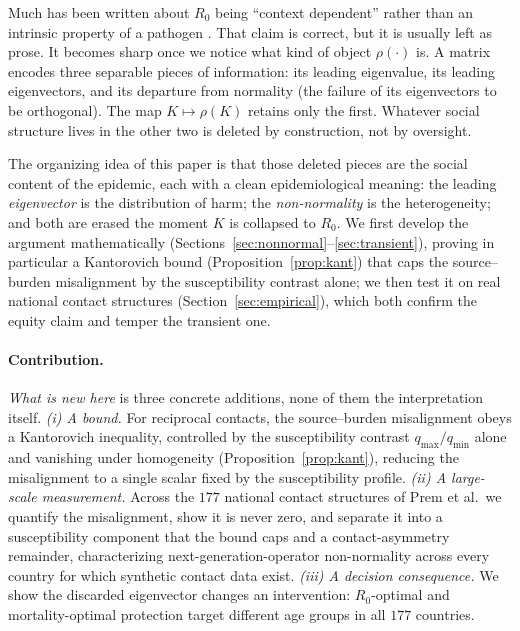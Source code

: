 \documentclass[12pt]{article}
\begin{document}
Much has been written about $R_0$ being ``context dependent'' rather than an intrinsic property of a pathogen \cite{delamater2019}. That claim is correct, but it is usually left as prose. It becomes sharp once we notice what kind of object $\rho(\cdot)$ is. A matrix encodes three separable pieces of information: its leading eigenvalue, its leading eigenvectors, and its departure from normality (the failure of its eigenvectors to be orthogonal). The map $K\mapsto\rho(K)$
retains only the first. Whatever social structure lives in the other two is deleted by construction, not by oversight.

The organizing idea of this paper is that those deleted pieces are the social content of the epidemic, each with a clean epidemiological meaning:
the leading \emph{eigenvector} is the distribution of harm; the \emph{non-normality} is the heterogeneity; and both are erased the moment $K$ is collapsed to $R_0$.
We first develop the argument mathematically (Sections~\ref{sec:nonnormal}--\ref{sec:transient}), proving in particular a Kantorovich bound (Proposition~\ref{prop:kant}) that caps the source--burden misalignment by the susceptibility contrast alone; we then test it on real national contact structures (Section~\ref{sec:empirical}), which both confirm the equity claim and temper the
transient one.


\paragraph{Contribution.}\emph{What is new here} is three concrete additions, none of them the interpretation itself. \emph{(i) A bound.} For reciprocal contacts, the source--burden misalignment obeys a Kantorovich inequality, controlled by the susceptibility contrast $q_{\max}/q_{\min}$ alone and vanishing under homogeneity (Proposition~\ref{prop:kant}), reducing the misalignment to a single scalar fixed by the susceptibility profile. \emph{(ii) A large-scale measurement.} Across the $177$ national contact structures of Prem et al.\ we quantify the misalignment, show it is never zero, and separate it into a susceptibility component that the bound caps and a contact-asymmetry remainder, characterizing next-generation-operator non-normality across every country for which synthetic contact data exist. \emph{(iii) A decision consequence.} We show the discarded eigenvector changes an intervention: $R_0$-optimal and mortality-optimal protection target different age groups in all $177$ countries.
\end{document}
